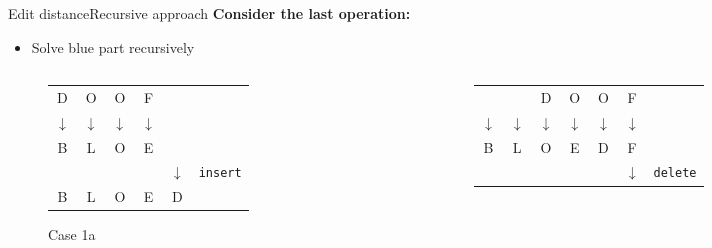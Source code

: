 
\begin{frame}{Edit distance}{Recursive approach}
  \textbf{Consider the last operation:}
  \begin{itemize}
    \item<2->
      Solve {\color{MainA}blue} part recursively
  \end{itemize}
  \begin{columns}[T]
    \begin{column}{0.3\linewidth}
      \begin{figure}[!h]
        \begin{center}
          \begin{tabular}{c@{}c@{}c@{}c@{}c@{}l}
            \color{MainA}D & \color{MainA}O & \color{MainA}O &
            \color{MainA}F\\
            \color{MainA}$\downarrow$ & \color{MainA}$\downarrow$ &
            \color{MainA}$\downarrow$ & \color{MainA}$\downarrow$\\
            \color{MainA}B & \color{MainA}L & \color{MainA}O &
            \color{MainA}E\\
            {} & {} & {} & {} & $\downarrow$ & \texttt{insert}\\
            B & L & O & E & D
          \end{tabular}
        \end{center}
        \caption{Case 1a}
      \end{figure}
    \end{column}
    \begin{column}{0.3\linewidth}
      \begin{figure}[!h]
        \begin{center}
          \begin{tabular}{c@{}c@{}c@{}c@{}c@{}c@{}l}
            {} & {} & \color{MainA}D & \color{MainA}O &
            \color{MainA}O & \color{MainA}F\\
            \color{MainA}$\downarrow$ & \color{MainA}$\downarrow$ &
            \color{MainA}$\downarrow$ & \color{MainA}$\downarrow$ &
            \color{MainA}$\downarrow$ & \color{MainA}$\downarrow$\\
            \color{MainA}B & \color{MainA}L & \color{MainA}O &
            \color{MainA}E & \color{MainA}D & \color{MainA}F\\
            {} & {} & {} & {} & {} & $\downarrow$ & \texttt{delete}\\

\end{tabular}
\end{center}
\end{figure}
\end{column}
\end{columns}
\end{frame}

